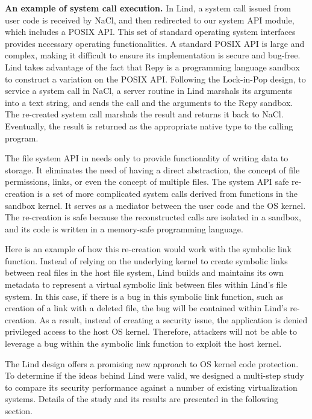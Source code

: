 \textbf{An example of system call execution.}
In Lind, a system call issued from user code is
received by NaCl, and then redirected to our system API module, which
includes a POSIX API. This set of standard
operating system interfaces provides
necessary operating functionalities. A standard POSIX API is large and complex,
making it difficult to ensure its implementation is secure and bug-free.
Lind takes advantage of the fact that Repy is a programming language sandbox to
construct a variation on the POSIX API. Following the
Lock-in-Pop design, to service a system call in NaCl, a server routine in
Lind marshals its arguments into a text string, and sends the call and the arguments
to the Repy sandbox. The re-created system call marshals the result and
returns it back to NaCl. Eventually, the result is returned as the appropriate
native type to the calling program.

The file system API in \lip needs only
to provide functionality of writing data to storage.
It eliminates the need of having a direct abstraction, the
concept of file permissions, links, or even the concept of multiple files.
The system API safe re-creation is a set of more complicated system calls
derived from functions in the sandbox kernel.
It serves as a mediator between the user code
and the OS kernel. The re-creation is safe
because the reconstructed calls are isolated in a sandbox, and its code is written 
in a memory-safe programming language.

Here is an example of how this re-creation would work with the symbolic link function. 
Instead of relying on the underlying kernel to create symbolic links between real files 
in the host file system, Lind builds and maintains its own metadata to represent a virtual symbolic link 
between files within Lind's file system. In this case, if there is a bug in this symbolic link function, 
such as creation of a link with a deleted file, the bug will be contained within Lind's re-creation. 
As a result, instead of creating a security issue, the application is denied privileged access
to the host OS kernel. 
Therefore, attackers will not be able to leverage a bug within the symbolic link function to 
exploit the host kernel.  

The Lind design offers a promising new approach to OS kernel code protection. 
To determine if the ideas behind Lind were valid, we 
designed a multi-step study to compare its security performance against a number 
of existing virtualization systems. Details of the study and its results are presented 
in the following section.

